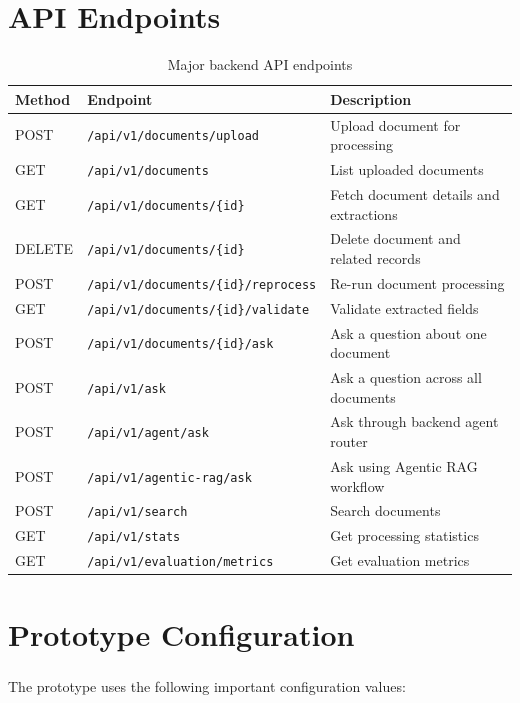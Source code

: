 \chapter{API Endpoints}
\label{appendix:api_endpoints}

\begin{table}[h]
\centering
\begin{tabular}{lll}
\toprule
\textbf{Method} & \textbf{Endpoint} & \textbf{Description} \\
\midrule
POST & \texttt{/api/v1/documents/upload} & Upload document for processing \\
GET & \texttt{/api/v1/documents} & List uploaded documents \\
GET & \texttt{/api/v1/documents/\{id\}} & Fetch document details and extractions \\
DELETE & \texttt{/api/v1/documents/\{id\}} & Delete document and related records \\
POST & \texttt{/api/v1/documents/\{id\}/reprocess} & Re-run document processing \\
GET & \texttt{/api/v1/documents/\{id\}/validate} & Validate extracted fields \\
POST & \texttt{/api/v1/documents/\{id\}/ask} & Ask a question about one document \\
POST & \texttt{/api/v1/ask} & Ask a question across all documents \\
POST & \texttt{/api/v1/agent/ask} & Ask through backend agent router \\
POST & \texttt{/api/v1/agentic-rag/ask} & Ask using Agentic RAG workflow \\
POST & \texttt{/api/v1/search} & Search documents \\
GET & \texttt{/api/v1/stats} & Get processing statistics \\
GET & \texttt{/api/v1/evaluation/metrics} & Get evaluation metrics \\
\bottomrule
\end{tabular}
\caption{Major backend API endpoints}
\label{tab:api_endpoints}
\end{table}

\chapter{Prototype Configuration}
\label{appendix:configuration}

\paragraph{} The prototype uses the following important configuration values:

